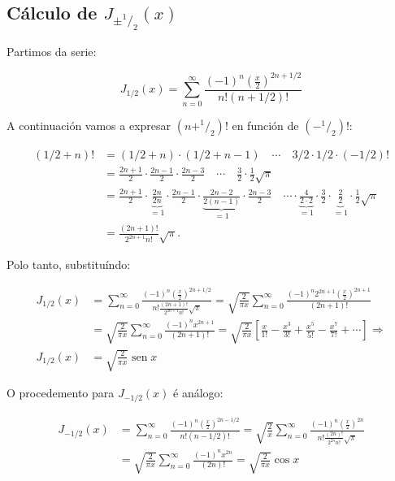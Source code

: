 \documentclass[a4paper,12pt,titlepage]{article}
\begin{document}
\newpage

\subsection{Cálculo de $J_{\pm^1/_2}(x)$}

Partimos da serie:

$$
J_{1 / 2}(x)=\sum_{n=0}^{\infty} \frac{(-1)^{n}\left(\frac{x}{2}\right)^{2 n+1 / 2}}{n !(n+1 / 2) !}
$$

A continuación vamos a expresar $(n+ ^1/_2)!$ en función de $(- ^1/_2)!$:

$$
\begin{aligned}
(1 / 2+n) ! & =(1 / 2+n) \cdot(1 / 2+n-1) \quad \cdots \quad 3 / 2 \cdot 1 / 2 \cdot(-1 / 2) ! \\
& =\frac{2 n+1}{2} \cdot \frac{2 n-1}{2} \cdot \frac{2 n-3}{2} \quad \cdots \quad \frac{3}{2} \cdot \frac{1}{2} \sqrt{\pi} \\
& =\frac{2 n+1}{2} \cdot \underbrace{\frac{2 n}{2 n}}_{=1} \cdot \frac{2 n-1}{2} \cdot \underbrace{\frac{2 n-2}{2(n-1)}}_{=1} \cdot \frac{2 n-3}{2} \quad \cdots \cdot \underbrace{\frac{4}{2 \cdot 2}}_{=1} \cdot \frac{3}{2} \cdot \underbrace{\frac{2}{2}}_{=1} \cdot \frac{1}{2} \sqrt{\pi} \\
& =\frac{(2 n+1) !}{2^{2 n+1} n !} \sqrt{\pi} .
\end{aligned}
$$

Polo tanto, substituíndo:

$$
\begin{aligned}
J_{1 / 2}(x) & =\sum_{n=0}^{\infty} \frac{(-1)^{n}\left(\frac{x}{2}\right)^{2 n+1 / 2}}{n ! \frac{(2 n+1) !}{2^{2 n+1} n !} \sqrt{\pi}}=\sqrt{\frac{2}{\pi x}} \sum_{n=0}^{\infty} \frac{(-1)^{n} 2^{2 n+1}\left(\frac{x}{2}\right)^{2 n+1}}{(2 n+1) !} \\
& =\sqrt{\frac{2}{\pi x}} \sum_{n=0}^{\infty} \frac{(-1)^{n} x^{2 n+1}}{(2 n+1) !}=\sqrt{\frac{2}{\pi x}}\left[\frac{x}{1 !}-\frac{x^{3}}{3 !}+\frac{x^{5}}{5 !}-\frac{x^{7}}{7 !}+\cdots\right] \Rightarrow \\
J_{1 / 2}(x) & =\sqrt{\frac{2}{\pi x}} \operatorname{sen} x
\end{aligned}
$$

O procedemento para $J_{-1 / 2}(x)$ é análogo:

$$
\begin{aligned}
J_{-1 / 2}(x) & =\sum_{n=0}^{\infty} \frac{(-1)^{n}\left(\frac{x}{2}\right)^{2 n-1 / 2}}{n !(n-1 / 2) !}=\sqrt{\frac{2}{x}} \sum_{n=0}^{\infty} \frac{(-1)^{n}\left(\frac{x}{2}\right)^{2 n}}{n ! \frac{(2 n) !}{2^{2 n} n !} \sqrt{\pi}} \\
& =\sqrt{\frac{2}{\pi x}} \sum_{n=0}^{\infty} \frac{(-1)^{n} x^{2 n}}{(2 n) !}=\sqrt{\frac{2}{\pi x}} \cos x
\end{aligned}
$$
\end{document}
